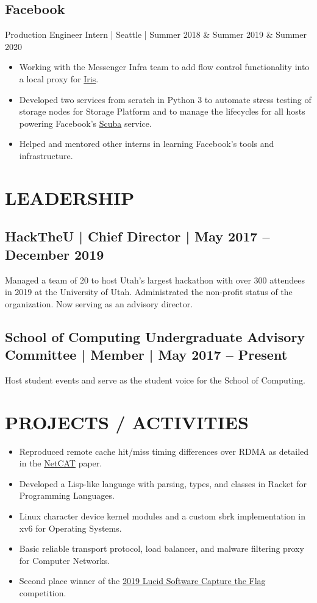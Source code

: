\documentclass[10pt, letterpaper]{resume}
\begin{document}
\subsection{Facebook}
Production Engineer Intern | Seattle | Summer 2018 \& Summer 2019 \& Summer 2020
\begin{itemize}
    \item Working with the Messenger Infra team to add flow control functionality into a local proxy for \href{https://engineering.fb.com/production-engineering/building-mobile-first-infrastructure-for-messenger/}{Iris}.
 \item Developed two services from scratch in Python 3 to automate stress testing of storage nodes for Storage Platform and to manage the lifecycles for all hosts powering Facebook's \href{https://research.fb.com/wp-content/uploads/2016/11/scuba-diving-into-data-at-facebook.pdf}{Scuba} service.
 \item Helped and mentored other interns in learning Facebook's tools and infrastructure.
\end{itemize}

\section{LEADERSHIP}
\subsection{HackTheU {\normalfont | Chief Director | May 2017 -- December 2019}}
Managed a team of 20 to host Utah’s largest hackathon with over 300 attendees in 2019 at the University of Utah. Administrated the non-profit status of the organization. Now serving as an advisory director.

\subsection{School of Computing Undergraduate Advisory Committee {\normalfont |  Member | May 2017 -- Present}}
Host student events and serve as the student voice for the School of Computing.

\section{PROJECTS / ACTIVITIES}
\begin{itemize}
 \item Reproduced remote cache hit/miss timing differences over RDMA as detailed in the \href{https://download.vusec.net/papers/netcat_sp20.pdf}{NetCAT} paper.
 \item Developed a Lisp-like language with parsing, types, and classes in Racket for Programming Languages.
 \item Linux character device kernel modules and a custom sbrk implementation in xv6 for Operating Systems.
 \item Basic reliable transport protocol, load balancer, and malware filtering proxy for Computer Networks.
 \item Second place winner of the \href{https://github.com/lucidsoftware/ctf2019}{2019 Lucid Software Capture the Flag} competition.
\end{itemize}
\end{document}
